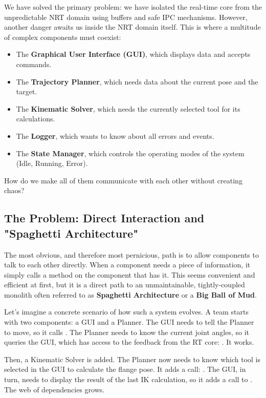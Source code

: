 We have solved the primary problem: we have isolated the real-time core from the unpredictable NRT domain using buffers and safe IPC mechanisms. However, another danger awaits us inside the NRT domain itself. This is where a multitude of complex components must coexist:
\begin{itemize}
    \item The \textbf{Graphical User Interface (GUI)}, which displays data and accepts commands.
    \item The \textbf{Trajectory Planner}, which needs data about the current pose and the target.
    \item The \textbf{Kinematic Solver}, which needs the currently selected tool for its calculations.
    \item The \textbf{Logger}, which wants to know about all errors and events.
    \item The \textbf{State Manager}, which controls the operating modes of the system (Idle, Running, Error).
\end{itemize}
How do we make all of them communicate with each other without creating chaos?

\subsection{The Problem: Direct Interaction and "Spaghetti Architecture"}
\label{subsec:spaghetti_problem}

The most obvious, and therefore most pernicious, path is to allow components to talk to each other directly. When a component needs a piece of information, it simply calls a method on the component that has it. This seems convenient and efficient at first, but it is a direct path to an unmaintainable, tightly-coupled monolith often referred to as \textbf{Spaghetti Architecture} or a \textbf{Big Ball of Mud}.

Let's imagine a concrete scenario of how such a system evolves. A team starts with two components: a GUI and a Planner. The GUI needs to tell the Planner to move, so it calls . The Planner needs to know the current joint angles, so it queries the GUI, which has access to the feedback from the RT core: . It works.

Then, a Kinematic Solver is added. The Planner now needs to know which tool is selected in the GUI to calculate the flange pose. It adds a call: . The GUI, in turn, needs to display the result of the last IK calculation, so it adds a call to . The web of dependencies grows.

